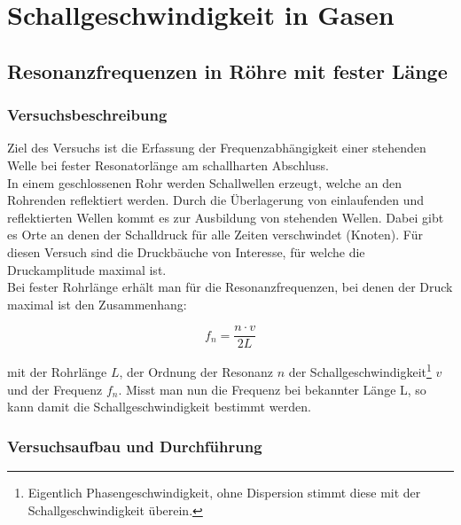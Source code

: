 \documentclass[12pt,a4paper]{article}
\author{Tim}
\begin{document}
\tableofcontents
\newpage

\section{Schallgeschwindigkeit in Gasen}

\subsection{Resonanzfrequenzen in Röhre mit fester Länge}

\subsubsection{Versuchsbeschreibung}

Ziel des Versuchs ist die Erfassung der Frequenzabhängigkeit einer stehenden Welle bei fester Resonatorlänge am schallharten Abschluss.\\
In einem geschlossenen Rohr werden Schallwellen erzeugt, welche an den Rohrenden reflektiert werden. Durch die Überlagerung von einlaufenden und reflektierten Wellen kommt es zur Ausbildung von stehenden Wellen. Dabei gibt es Orte an denen der Schalldruck für alle Zeiten verschwindet (Knoten). Für diesen Versuch sind die Druckbäuche von Interesse, für welche die Druckamplitude maximal ist.\\
Bei fester Rohrlänge erhält man für die Resonanzfrequenzen, bei denen der Druck maximal ist den Zusammenhang:

\begin{equation}
	f_n=\frac{n\cdot v}{2L}
\end{equation}

mit der Rohrlänge $L$, der Ordnung der Resonanz $n$ der Schallgeschwindigkeit\footnote{Eigentlich Phasengeschwindigkeit, ohne Dispersion stimmt diese mit der Schallgeschwindigkeit überein.}  $v$ und der Frequenz $f_n$.
Misst man nun die Frequenz bei bekannter Länge L, so kann damit die Schallgeschwindigkeit bestimmt werden.\\

\subsubsection{Versuchsaufbau und Durchführung}
\end{document}
